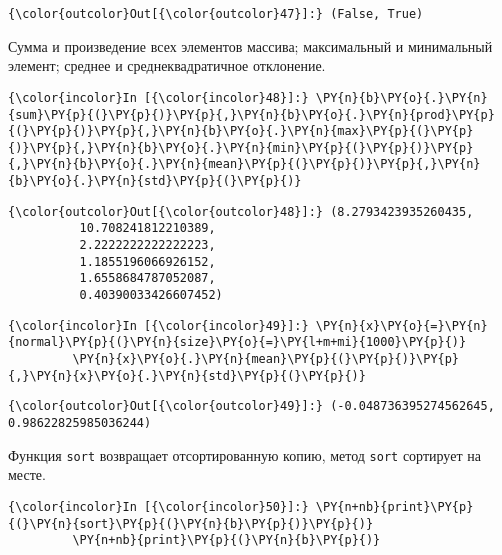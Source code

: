             \begin{Verbatim}[commandchars=\\\{\}]
{\color{outcolor}Out[{\color{outcolor}47}]:} (False, True)
\end{Verbatim}
        
    Сумма и произведение всех элементов массива; максимальный и минимальный
элемент; среднее и среднеквадратичное отклонение.

    \begin{Verbatim}[commandchars=\\\{\}]
{\color{incolor}In [{\color{incolor}48}]:} \PY{n}{b}\PY{o}{.}\PY{n}{sum}\PY{p}{(}\PY{p}{)}\PY{p}{,}\PY{n}{b}\PY{o}{.}\PY{n}{prod}\PY{p}{(}\PY{p}{)}\PY{p}{,}\PY{n}{b}\PY{o}{.}\PY{n}{max}\PY{p}{(}\PY{p}{)}\PY{p}{,}\PY{n}{b}\PY{o}{.}\PY{n}{min}\PY{p}{(}\PY{p}{)}\PY{p}{,}\PY{n}{b}\PY{o}{.}\PY{n}{mean}\PY{p}{(}\PY{p}{)}\PY{p}{,}\PY{n}{b}\PY{o}{.}\PY{n}{std}\PY{p}{(}\PY{p}{)}
\end{Verbatim}

            \begin{Verbatim}[commandchars=\\\{\}]
{\color{outcolor}Out[{\color{outcolor}48}]:} (8.2793423935260435,
          10.708241812210389,
          2.2222222222222223,
          1.1855196066926152,
          1.6558684787052087,
          0.40390033426607452)
\end{Verbatim}
        
    \begin{Verbatim}[commandchars=\\\{\}]
{\color{incolor}In [{\color{incolor}49}]:} \PY{n}{x}\PY{o}{=}\PY{n}{normal}\PY{p}{(}\PY{n}{size}\PY{o}{=}\PY{l+m+mi}{1000}\PY{p}{)}
         \PY{n}{x}\PY{o}{.}\PY{n}{mean}\PY{p}{(}\PY{p}{)}\PY{p}{,}\PY{n}{x}\PY{o}{.}\PY{n}{std}\PY{p}{(}\PY{p}{)}
\end{Verbatim}

            \begin{Verbatim}[commandchars=\\\{\}]
{\color{outcolor}Out[{\color{outcolor}49}]:} (-0.048736395274562645, 0.98622825985036244)
\end{Verbatim}
        
    Функция \texttt{sort} возвращает отсортированную копию, метод
\texttt{sort} сортирует на месте.

    \begin{Verbatim}[commandchars=\\\{\}]
{\color{incolor}In [{\color{incolor}50}]:} \PY{n+nb}{print}\PY{p}{(}\PY{n}{sort}\PY{p}{(}\PY{n}{b}\PY{p}{)}\PY{p}{)}
         \PY{n+nb}{print}\PY{p}{(}\PY{n}{b}\PY{p}{)}
\end{Verbatim}


